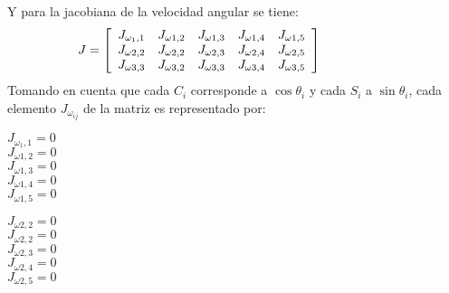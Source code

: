 \documentclass[journal]{IEEEtran}
\begin{document}
    
    Y para la jacobiana de la velocidad angular se tiene:
    \begin{equation*}
        \hspace{-10mm}
        J = \left[
            \begin{array}{ccccc}
                J_{\omega_1 ,1} & J_{\omega1 ,2} & J_{\omega1 ,3} & J_{\omega1 ,4} & J_{\omega1 ,5}\\
                J_{\omega2 ,2} & J_{\omega2 ,2} & J_{\omega2 ,3} & J_{\omega2 ,4} & J_{\omega2 ,5}\\
                J_{\omega3 ,3 } & J_{\omega3,2} & J_{\omega3 ,3} & J_{\omega3 ,4} & J_{\omega3 ,5}\\
            \end{array}\right] 
            \hspace{10mm}
    \end{equation*} 
    \noindent Tomando en cuenta que cada $C_i$ corresponde a $\cos \theta_i$ y cada $S_i$ a $\sin \theta_i$, cada elemento
    $J_{\omega_{ij}}$ de la matriz es representado por:
    \begin{flushleft}
        \(J_{\omega_1 ,1} = 0 \)\\ \vspace{0.25cm}
        \(J_{\omega1 ,2} = 0\) \\ \vspace{0.25cm}
        \(J_{\omega1 ,3} = 0\) \\ \vspace{0.25cm}
        \(J_{\omega1 ,4} = 0\) \\ \vspace{0.25cm}
        \(J_{\omega1 ,5} = 0\) \\ \vspace{0.25cm}
    \end{flushleft}

    \begin{flushleft}
        \(J_{\omega2 ,2} = 0 \) \\ \vspace{0.25cm}
        \(J_{\omega2 ,2} = 0\) \\ \vspace{0.25cm}
        \(J_{\omega2 ,3} =0\) \\ \vspace{0.25cm}
        \(J_{\omega2 ,4} =0\) \\ \vspace{0.25cm}
        \(J_{\omega2 ,5 } =0\) \\ \vspace{0.25cm}
    \end{flushleft}
\end{document}
